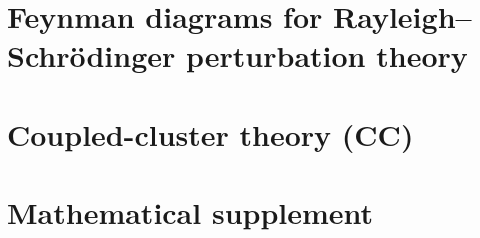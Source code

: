\documentclass{report}
\theoremstyle{plain}
\theoremstyle{definition}
\begin{document}



\chapter{Feynman diagrams for Rayleigh--Schr\"odinger perturbation
  theory}
\label{sec:feynman}


\chapter{Coupled-cluster theory (CC)}
\label{sec:cc}




\appendix
\chapter{Mathematical supplement}
\label{ch:mathematical-supplement}




%





\end{document}
